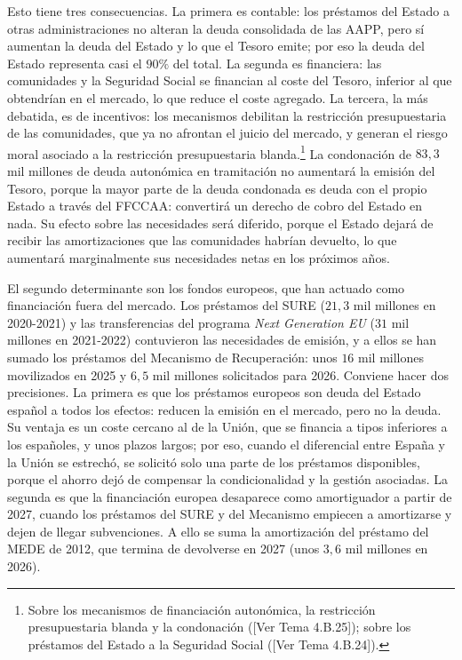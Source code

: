 \documentclass[10pt,a4paper]{article}
\newcommand{\authorfont}[1]{{\fontfamily{EBGaramond-TLF}\selectfont #1}}
\begin{document}
Esto tiene tres consecuencias. La primera es contable: los préstamos del Estado a otras administraciones no alteran la deuda consolidada de las AAPP, pero sí aumentan la deuda del Estado y lo que el Tesoro emite; por eso la deuda del Estado representa casi el $90\%$ del total. La segunda es financiera: las comunidades y la Seguridad Social se financian al coste del Tesoro, inferior al que obtendrían en el mercado, lo que reduce el coste agregado. La tercera, la más debatida, es de incentivos: los mecanismos debilitan la restricción presupuestaria de las comunidades, que ya no afrontan el juicio del mercado, y generan el riesgo moral asociado a la restricción presupuestaria blanda.\footnote{%
    Sobre los mecanismos de financiación autonómica, la restricción presupuestaria blanda y la condonación ([\authorfont{Ver Tema 4.B.25}]); sobre los préstamos del Estado a la Seguridad Social ([\authorfont{Ver Tema 4.B.24}]).
} La condonación de $83,3$ mil millones de deuda autonómica en tramitación no aumentará la emisión del Tesoro, porque la mayor parte de la deuda condonada es deuda con el propio Estado a través del FFCCAA: convertirá un derecho de cobro del Estado en nada. Su efecto sobre las necesidades será diferido, porque el Estado dejará de recibir las amortizaciones que las comunidades habrían devuelto, lo que aumentará marginalmente sus necesidades netas en los próximos años.

El segundo determinante son los fondos europeos, que han actuado como financiación fuera del mercado. Los préstamos del SURE ($21,3$ mil millones en 2020-2021) y las transferencias del programa \textit{Next Generation EU} ($31$ mil millones en 2021-2022) contuvieron las necesidades de emisión, y a ellos se han sumado los préstamos del Mecanismo de Recuperación: unos $16$ mil millones movilizados en 2025 y $6,5$ mil millones solicitados para 2026. Conviene hacer dos precisiones. La primera es que los préstamos europeos son deuda del Estado español a todos los efectos: reducen la emisión en el mercado, pero no la deuda. Su ventaja es un coste cercano al de la Unión, que se financia a tipos inferiores a los españoles, y unos plazos largos; por eso, cuando el diferencial entre España y la Unión se estrechó, se solicitó solo una parte de los préstamos disponibles, porque el ahorro dejó de compensar la condicionalidad y la gestión asociadas. La segunda es que la financiación europea desaparece como amortiguador a partir de 2027, cuando los préstamos del SURE y del Mecanismo empiecen a amortizarse y dejen de llegar subvenciones. A ello se suma la amortización del préstamo del MEDE de 2012, que termina de devolverse en 2027 (unos $3,6$ mil millones en 2026).
\end{document}
